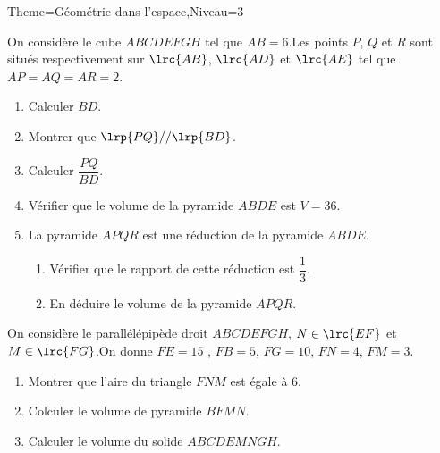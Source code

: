 \documentclass[a4paper,12pt]{article}
\begin{document}
\begin{Maquette}[Fiche]{Theme=Géométrie dans l'espace,Niveau=3}
\begin{exercice}%
\begin{minipage}{0.7\linewidth}
On considère le cube $ABCDEFGH$ tel que $AB=6$.Les points $P$, $Q$ et $R$ sont situés respectivement sur $\lrc{AB}$, $\lrc{AD}$ et $\lrc{AE}$ tel que $AP=AQ=AR=2$.
\begin{enumerate}
\item Calculer $BD$.
\item Montrer que $\lrp{PQ}//\lrp{BD}$.
\item Calculer $\dfrac{PQ}{BD}$.
\item Vérifier que le volume de la pyramide $ABDE$ est $V=36$.
\item La pyramide $APQR$ est une réduction de la pyramide $ABDE$.
\begin{enumerate}
\item Vérifier que le rapport de cette réduction est $\dfrac{1}{3}$.
\item En déduire le volume de la pyramide $APQR$.
\end{enumerate}
\end{enumerate}
\end{minipage}%
\begin{minipage}{0.3\linewidth}
\end{minipage}
\end{exercice}

\begin{exercice}
\begin{minipage}{.5\linewidth}
On considère le parallélépipède droit $ABCDEFGH$, $N\in \lrc{EF}$ et $M\in \lrc{FG}$.On donne $FE=15$ , $FB=5$, $FG=10$, $FN=4$, $FM=3$.
\begin{enumerate}
\item Montrer que l'aire du triangle $FNM$ est égale à $6$.
\item Colculer le volume de pyramide $BFMN$.
\item Calculer le volume du solide $ABCDEMNGH$.
\end{enumerate}
\end{minipage}%
\begin{minipage}{.5\linewidth}
\end{minipage}
\end{exercice}


\end{Maquette}
\end{document}
